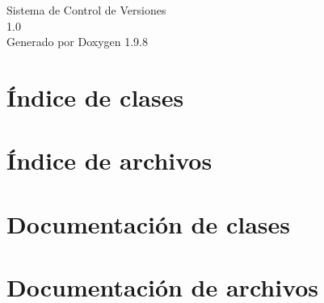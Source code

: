 \documentclass[twoside]{book}
\newcommand{\+}{\discretionary{\mbox{\scriptsize$\hookleftarrow$}}{}{}}
\newcommand{\clearemptydoublepage}{%
    \newpage{\pagestyle{empty}\cleardoublepage}%
  }
\begin{document}
  \raggedbottom
    \hypersetup{pageanchor=false,
                bookmarksnumbered=true,
                pdfencoding=unicode
               }
  \begin{titlepage}
  \vspace*{7cm}
  \begin{center}%
  {\Large Sistema de Control de Versiones}\\
  [1ex]\large 1.\+0 \\
  \vspace*{1cm}
  {\large Generado por Doxygen 1.9.8}\\
  \end{center}
  \end{titlepage}
  \clearemptydoublepage
  \tableofcontents
  \clearemptydoublepage
  \hypersetup{pageanchor=true}

\chapter{Índice de clases}

\chapter{Índice de archivos}

\chapter{Documentación de clases}

\chapter{Documentación de archivos}








  \backmatter
  \newpage
  \clearemptydoublepage
  \printindex
\end{document}
